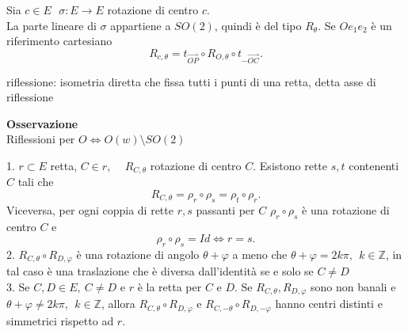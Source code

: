 \documentclass[12px]{article}
\begin{document}
\newpage
Sia $c\in E\ \ \ \sigma : E \rightarrow E$  rotazione di centro $c$.\\
La parte lineare di $\sigma$ appartiene a $SO(2)$, quindi è del tipo $R_\theta$. Se $Oe_1e_2$ è un riferimento cartesiano
\[
	R_{c,\theta} = t_{\overrightarrow{OP}}\circ R_{O,\theta} \circ t_{-\overrightarrow{OC}}
.\] 
\begin{nome}
	riflessione: isometria diretta che fissa tutti i punti di una retta, detta asse di riflessione
\end{nome}
\textbf{Osservazione}\\
Riflessioni per $O  \Leftrightarrow O(w)\setminus SO(2)$
\begin{lemm}
	1. $r\subset E$ retta, $C\in r$, \ \  $R_{C,\theta}$ rotazione di centro $C$. Esistono rette $s,t$ contenenti $C$ tali che 
	\[
		R_{C,\theta} = \rho_r\circ\rho_s=\rho_t\circ\rho_r
	.\] 
	Viceversa, per ogni coppia di rette $r,s$ passanti per $C$ $\rho_r\circ\rho_s$ è una rotazione di centro $C$ e \[\rho_r\circ\rho_s = Id \Leftrightarrow r = s.\]
	2. $R_{C,\theta}\circ R_{D,\varphi}$ è una rotazione di angolo $\theta + \varphi$ a meno che $\theta + \varphi = 2k\pi,\ \ k\in\mathbb{Z}$, in tal caso è una traslazione che è diversa dall'identità se e solo se $C\neq D$\\
	3. Se $C,D\in E, \ C\neq D$ e $r$ è la retta per $C$ e $D$. Se $R_{C,\theta}, R_{D,\varphi}$ sono non banali e $\theta + \varphi\neq 2k\pi, \ \ k\in \mathbb{Z}$, allora $R_{C,\theta}\circ R_{D,\varphi}$ e $R_{C,-\theta}\circ R_{D,-\varphi}$ hanno centri distinti e simmetrici rispetto ad $r$.
\end{lemm}
\end{document}
